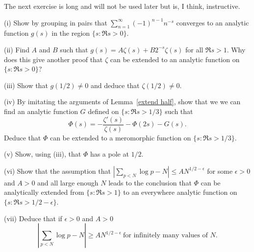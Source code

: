 The next exercise is long and will not be used later but is,
I think, instructive.
\begin{exercise} (i) Show by grouping in pairs
that $\sum_{n=1}^{\infty}(-1)^{n-1}n^{-s}$
converges to an analytic function $g(s)$ in the
region $\{s:\Re s>0\}$.

(ii) Find $A$ and $B$ such that $g(s)=A\zeta(s)+B2^{-s}\zeta(s)$
for all $\Re s>1$. Why does this give another proof
that $\zeta$ can be extended to an analytic function
on $\{s:\Re s>0\}$?

(iii) Show that $g(1/2)\neq 0$ and deduce that $\zeta(1/2)\neq 0$.

(iv) By imitating the arguments of Lemma~\ref{extend half},
show that we we can find an analytic function $G$ defined
on $\{s:\Re s>1/3\}$ such that
\[\Phi(s)=-\frac{\zeta'(s)}{\zeta(s)}-\Phi(2s)-G(s).\]
Deduce that $\Phi$ can be extended to a meromorphic
function on $\{s:\Re s>1/3\}$.

(v) Show, using (iii), that $\Phi$ has a pole at $1/2$.

(vi) Show that the assumption that
$|\sum_{p<N}\log p -N|\leq A N^{1/2-\epsilon}$ for
some $\epsilon>0$ and $A>0$ and all large enough $N$
leads to the conclusion that
$\Phi$ can be analytically extended from $\{s:\Re s>1\}$
to an everywhere analytic function
on $\{s:\Re s>1/2-\epsilon\}$.

(vii) Deduce that if $\epsilon>0$ and $A>0$
\[|\sum_{p<N}\log p -N|\geq A N^{1/2-\epsilon}
\ \text{for infinitely many values of $N$.}\]
\end{exercise}

